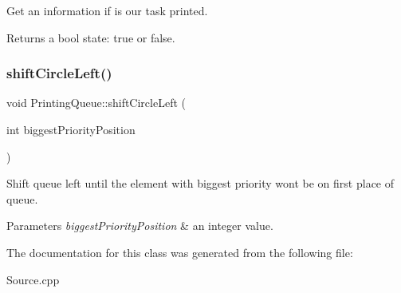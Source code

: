 Get an information if is our task printed. 

\begin{DoxyReturn}{Returns}
a bool state\+: true or false. 
\end{DoxyReturn}
\mbox{\label{class_printing_queue_a6e0a48416ddf06b841e1bae87ded0ab6}} 
\subsubsection{\texorpdfstring{shift\+Circle\+Left()}{shiftCircleLeft()}}
{\footnotesize\ttfamily void Printing\+Queue\+::shift\+Circle\+Left (\begin{DoxyParamCaption}\item[{int}]{biggest\+Priority\+Position }\end{DoxyParamCaption})}

Shift queue left until the element with biggest priority won\textquotesingle{}t be on first place of queue.


\begin{DoxyParams}{Parameters}
{\em biggest\+Priority\+Position} & an integer value. \\
\hline
\end{DoxyParams}


The documentation for this class was generated from the following file\+:\begin{DoxyCompactItemize}
\item 
Source.\+cpp\end{DoxyCompactItemize}
